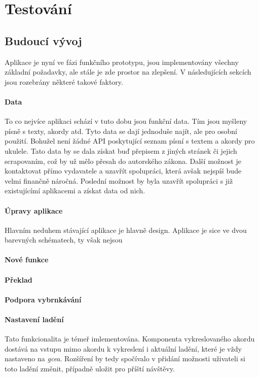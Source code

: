 \chapter{Testování}
\label{ch:testing}


\section{Budoucí vývoj}
\label{sc:upcomming_development}
Aplikace je nyní ve fázi funkčního prototypu, jsou implementovány všechny základní požadavky, ale stále je zde prostor na zlepšení. V následujících sekcích jsou rozebrány některé takové faktory.

\subsubsection{Data}
To co nejvíce aplikaci schází v tuto dobu jsou funkční data. Tím jsou myšleny písně s texty, akordy atd. Tyto data se dají jednoduše najít, ale pro osobní použití. Bohužel není žádné API poskytující seznam písní s textem a akordy pro ukulele. Tato data by se dala získat buď přepisem z jiných stránek či jejich scrapovaním, což by už mělo přesah do autorského zákona. Další možnost je kontaktovat přímo vydavatele a uzavřít spolupráci, která avšak nejspíš bude velmi finančně náročná. Poslední možnost by byla uzavřít spolupráci s již existujícímí aplikacemi a získat data od nich.

\subsubsection{Úpravy aplikace}
Hlavním neduhem stávající aplikace je hlavně design. Aplikace je sice ve dvou barevných schématech, ty však nejsou

\subsubsection{Nové funkce}
\subsubsection*{Překlad}

\subsubsection*{Podpora vybrnkávání}

\subsubsection*{Nastavení ladění}
Tato funkcionalita je témeř imlementována. Komponenta vykreslovaného akordu dostává na vstupu mimo akordu k vykreslení i aktuální ladění, které je vždy nastaveno na \emph{gcea}. Rozšíření by tedy spočívalo v přidání možnosti uživateli si toto ladění změnit, případně uložit pro příští návštěvy.

